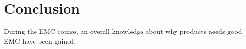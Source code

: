 \chapter{Conclusion}
During the EMC course, an overall knowledge about why products needs good EMC have been gained. 